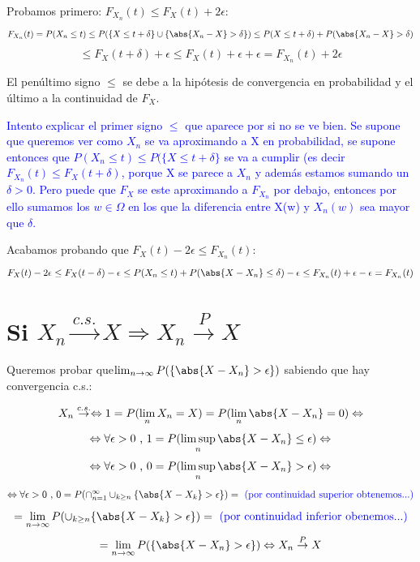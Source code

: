 \documentclass{apuntes}
\begin{document}
Probamos primero: $F_{X_n}(t) \leq F_X(t)+2\epsilon$:
\[
F_{X_n}(t) = P(X_n \leq t) \leq P(\{X \leq t+\delta\} \cup \{\abs{X_n -X} > \delta\}) \leq P(X \leq t+\delta)+ P(\abs{X_n -X} > \delta)
\]
\[
\leq F_X(t+\delta)+\epsilon \leq F_X(t)+\epsilon+\epsilon = F_{X_n}(t) + 2\epsilon
\]

El penúltimo signo $\leq$ se debe a la hipótesis de convergencia en probabilidad y el último a la continuidad de $F_X$.

\textcolor{blue}{Intento explicar el primer signo $\leq$ que aparece por si no se ve bien. Se supone que queremos ver como $X_n$ se va aproximando a X en probabilidad, se supone entonces que $P(X_n \leq t) \leq P(\{X \leq t+\delta\}$ se va a cumplir (es decir $F_{X_n}(t) \leq F_X(t+\delta)$, porque X se parece a $X_n$ y además estamos sumando un $\delta >0$. Pero puede que $F_X$ se este aproximando a $F_{X_n}$ por debajo, entonces por ello sumamos los $w \in \Omega$ en los que la diferencia entre X(w) y $X_n(w)$ sea mayor que $\delta$.}

Acabamos probando que $F_X(t)-2\epsilon \leq F_{X_n}(t)$:
\[
F_X(t)-2\epsilon \leq F_X(t-\delta)-\epsilon \leq P(X_n \leq t)+ P(\abs{X -X_n} \leq \delta) - \epsilon \leq F_{X_n}(t) + \epsilon - \epsilon  = F_{X_n}(t)
\]

\section{Si $X_n \stackrel{c.s.}{\rightarrow} X  \Rightarrow X_n \stackrel{P}{\rightarrow} X$}

Queremos probar que$ \lim_{n \rightarrow \infty} P(\{\abs{X-X_n} > \epsilon\})$ sabiendo que hay convergencia c.s.:

\[
X_n \stackrel{c.s.}{\rightarrow} \Leftrightarrow 1=P(\lim_n X_n = X) = P(\lim_n \abs{X-X_n}=0)\Leftrightarrow
\]
\[
\Leftrightarrow \forall \epsilon >0 \text{ , } 1=P(\limsup_n \abs{X-X_n} \leq \epsilon) \Leftrightarrow
\]
\[
\Leftrightarrow \forall \epsilon >0 \text{ , } 0=P(\limsup_n \abs{X-X_n} > \epsilon) \Leftrightarrow
\]
\[
\Leftrightarrow \forall \epsilon >0 \text{ , } 0=P(\cap_{n=1}^{\infty} \cup_{k \geq n} \{\abs{X-X_k} > \epsilon\}) = \text{ \textcolor{blue}{(por continuidad superior obtenemos...)}}
\]
\[
= \lim_{n \rightarrow
\infty} P( \cup_{k \geq n} \{\abs{X-X_k} > \epsilon\}) = \text{ \textcolor{blue}{(por continuidad inferior obenemos...)}}
\]
\[
= \lim_{n \rightarrow \infty} P(\{\abs{X-X_n} > \epsilon\})  \Leftrightarrow X_n \stackrel{P}{\rightarrow} X
\]
\end{document}
